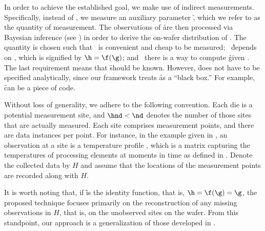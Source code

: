 In order to achieve the established goal, we make use of indirect measurements.
Specifically, instead of \g, we measure an auxiliary parameter \h, which we
refer to as the quantity of measurement. The observations of \h are then
processed via Bayesian inference (see ) in order to
derive the on-wafer distribution of \g. The quantity \h is chosen such that
\one~\h is convenient and cheap to be measured; \two~\h depends on \g, which is
signified by $\h = \f(\g)$; and \three~there is a way to compute \h given \g.
The last requirement means that \f should be known. However, \f does not have to
be specified analytically, since our framework treats \f as a ``black box.'' For
example, \f can be a piece of code.

Without loss of generality, we adhere to the following convention. Each die is a
potential measurement site, and $\hnd < \nd$ denotes the number of those sites
that are actually measured. Each site comprises \np measurement points, and
there are \ns data instances per point. For instance, in the example given in
, an observation at a site is a temperature profile \mq,
which is a matrix capturing the temperatures of \np processing elements at \ns
moments in time as defined in . Denote the collected
data by $H$ and assume that the locations of the measurement points are recorded
along with $H$.

It is worth noting that, if \f is the identity function, that is, $\h = \f(\g) =
\g$, the proposed technique focuses primarily on the reconstruction of any
missing observations in $H$, that is, on the unobserved sites on the wafer. From
this standpoint, our approach is a generalization of those developed in
\cite{reda2009, zhang2010}.

